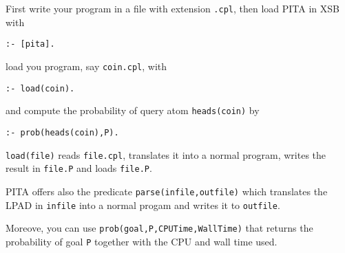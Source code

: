 First write your program in a file with extension \texttt{.cpl}, then load PITA in XSB with
\begin{verbatim}
:- [pita].
\end{verbatim}
load you program, say \texttt{coin.cpl}, with 
\begin{verbatim}
:- load(coin).
\end{verbatim}
and compute the probability of query atom \texttt{heads(coin)} by
\begin{verbatim}
:- prob(heads(coin),P).
\end{verbatim} 
%
\texttt{load(file)} reads \texttt{file.cpl}, translates it into a normal  program, writes the result in \texttt{file.P} and loads \texttt{file.P}.

PITA offers also the predicate \texttt{parse(infile,outfile)} which translates the LPAD in \texttt{infile} into a normal progam and writes it to  \texttt{outfile}.

Moreove, you can use \texttt{prob(goal,P,CPUTime,WallTime)} that returns the probability of goal \texttt{P} together with the CPU and wall time used.

